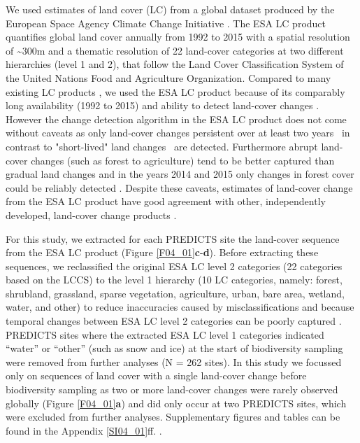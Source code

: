 We used estimates of land cover (LC) from a global dataset produced by the European Space Agency Climate Change Initiative \citep[][ver. 2.0.7 obtained from \href{http://maps.elie.ucl.ac.be/CCI}{http://maps.elie.ucl.ac.be/CCI} ]{ESA2017}. The ESA LC product quantifies global land cover annually from 1992 to 2015 with a spatial resolution of \textasciitilde 300m \citep{ESA2017} and a thematic resolution of 22 land-cover categories \citep[75.38\% global accuracy, ][]{ESA2017} at two different hierarchies (level 1 and 2), that follow the Land Cover Classification System \citep[LCCS, ][]{DiGregorio2000} of the United Nations Food and Agriculture Organization. Compared to many existing LC products \citep{Grekousis2015}, we used the ESA LC product because of its comparably long availability (1992 to 2015) and ability to detect land-cover changes \citep{ESA2017}. However the change detection algorithm in the ESA LC product does not come without caveats as only land-cover changes persistent over at least two years \textendash\ in contrast to "short-lived" land changes \citep{Lambin2006} \textendash\ are detected. Furthermore abrupt land-cover changes (such as forest to agriculture) tend to be better captured than gradual land changes \citep{ESA2017} and in the years 2014 and 2015 only changes in forest cover could be reliably detected \citep{ESA2017}. Despite these caveats, estimates of land-cover change from the ESA LC product have good agreement with other, independently developed, land-cover change products \citep{Li2018}.

For this study, we extracted for each PREDICTS site the land-cover sequence from the ESA LC product (Figure \ref{F04_01}\textbf{c}-\textbf{d}). Before extracting these sequences, we reclassified the original ESA LC level 2 categories (22 categories based on the LCCS) to the level 1 hierarchy (10 LC categories, namely: forest, shrubland, grassland, sparse vegetation, agriculture, urban, bare area, wetland, water, and other) to reduce inaccuracies caused by misclassifications and because temporal changes between ESA LC level 2 categories can be poorly captured \citep{ESA2017}. PREDICTS sites where the extracted ESA LC level 1 categories indicated “water” or “other” (such as snow and ice) at the start of biodiversity sampling were removed from further analyses (N = 262 sites). In this study we focussed only on sequences of land cover with a single land-cover change before biodiversity sampling as two or more land-cover changes were rarely observed globally (Figure \ref{F04_01}\textbf{a}) and did only occur at two PREDICTS sites, which were excluded from further analyses. Supplementary figures and tables can be found in the Appendix \ref{SI04_01}ff. .


